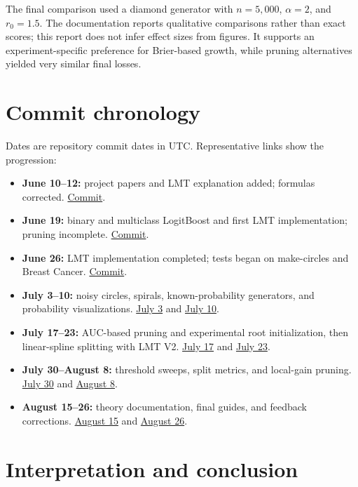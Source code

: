 \documentclass[10pt,twocolumn]{article}
\begin{document}
The final comparison used a diamond generator with $n=5{,}000$, $\alpha=2$, and $r_0=1.5$. The documentation reports qualitative comparisons rather than exact scores; this report does not infer effect sizes from figures. It supports an experiment-specific preference for Brier-based growth, while pruning alternatives yielded very similar final losses.
\section{Commit chronology}
Dates are repository commit dates in UTC. Representative links show the progression:
\begin{itemize}
\item \textbf{June 10--12:} project papers and LMT explanation added; formulas corrected. \href{https://github.com/Allison-Lara18/LMT-calibration/commit/e136f45b47}{Commit}.
\item \textbf{June 19:} binary and multiclass LogitBoost and first LMT implementation; pruning incomplete. \href{https://github.com/Allison-Lara18/LMT-calibration/commit/1a5eb027a0}{Commit}.
\item \textbf{June 26:} LMT implementation completed; tests began on make-circles and Breast Cancer. \href{https://github.com/Allison-Lara18/LMT-calibration/commit/0ff5942bff}{Commit}.
\item \textbf{July 3--10:} noisy circles, spirals, known-probability generators, and probability visualizations. \href{https://github.com/Allison-Lara18/LMT-calibration/commit/5e6b062380}{July 3} and \href{https://github.com/Allison-Lara18/LMT-calibration/commit/d5ce219ec5}{July 10}.
\item \textbf{July 17--23:} AUC-based pruning and experimental root initialization, then linear-spline splitting with LMT V2. \href{https://github.com/Allison-Lara18/LMT-calibration/commit/c04028e58e}{July 17} and \href{https://github.com/Allison-Lara18/LMT-calibration/commit/25eee85254}{July 23}.
\item \textbf{July 30--August 8:} threshold sweeps, split metrics, and local-gain pruning. \href{https://github.com/Allison-Lara18/LMT-calibration/commit/8f7b23f4d9}{July 30} and \href{https://github.com/Allison-Lara18/LMT-calibration/commit/5ff2011113}{August 8}.
\item \textbf{August 15--26:} theory documentation, final guides, and feedback corrections. \href{https://github.com/Allison-Lara18/LMT-calibration/commit/fcc2264c61}{August 15} and \href{https://github.com/Allison-Lara18/LMT-calibration/commit/ecfb3f7e67}{August 26}.
\end{itemize}\section{Interpretation and conclusion}
\end{document}
